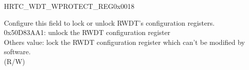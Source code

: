 \begin{register}{H}{RTC\_WDT\_WPROTECT\_REG}{0x0018}\label{regdesc:RTCWDTWPROTECTREG}
%
\regnewline%
\begin{regdesc}\begin{reglist}
\label{fielddesc:RTCWDTWKEY}\item [RTC\_WDT\_WKEY] Configure this field to lock or unlock RWDT's configuration registers.\\
0x50D83AA1: unlock the RWDT configuration register \\
Others value: lock the RWDT configuration register which can't be modified by software.\\
 (R/W)
\end{reglist}\end{regdesc}
\end{register}


